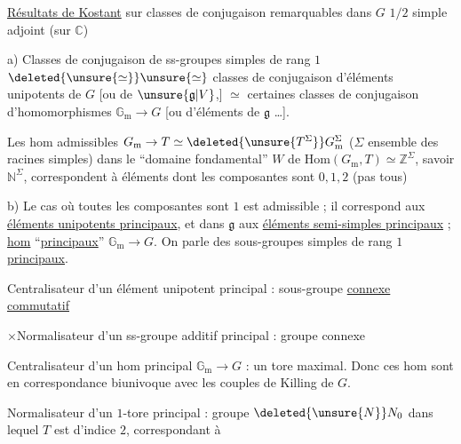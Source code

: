 \uline{Résultats de Kostant} sur classes de conjugaison remarquables dans $G$ $1/2$ simple adjoint (sur $\mathbb C$)

a) Classes de conjugaison de ss-groupes simples de rang $1$ $\deleted{\unsure{\simeq}}\unsure{\simeq}$ classes de conjugaison d'éléments unipotents de $G$ [ou de $\unsure{\mathfrak g|V}$,] $\simeq$ certaines classes de conjugaison \deleted{d'éléments semi-simples de $\mathfrak g$ [\uline{NB} \unsure{en de hom}\illegible{1} \unsure{princ.} ss} d'homomorphismes $\mathbb G_{\mathrm m}\to G$ [ou d'éléments de $\mathfrak g$ \ldots].

Les hom admissibles $G_{\mathrm m}\to T\simeq\deleted{\unsure{T^{\Sigma}}}G_{\mathrm m}^{\Sigma}$ ($\Sigma$ ensemble des racines simples) dans le ``domaine fondamental'' $W$ de $\mathrm{Hom}(G_{\mathrm m},T)\simeq\mathbb Z^{\Sigma}$, savoir $\mathbb N^{\Sigma}$, correspondent à  éléments dont les composantes sont $0,1,2$ (pas tous)


b) Le cas où toutes les composantes sont $1$ est admissible ; il correspond aux \uline{éléments unipotents principaux}, et dans $\mathfrak g$ aux \uline{éléments semi-simples principaux} ;  \uline{hom} ``\uline{principaux}'' $\mathbb G_{\mathrm m}\to G$. On parle des sous-groupes simples de rang $1$ \uline{principaux}.


Centralisateur d'un élément unipotent principal : sous-groupe \uline{connexe}  \uline{commutatif}

$\times$\quad Normalisateur d'un ss-groupe additif principal : groupe connexe 

Centralisateur d'un hom principal $\mathbb G_{\mathrm m}\to G$ : un tore maximal. Donc ces hom sont en correspondance biunivoque avec les couples de Killing de $G$.


Normalisateur d'un $1$-tore principal : groupe $\deleted{\unsure{N}}N_0$ dans lequel $T$ est d'indice $2$, correspondant à 

